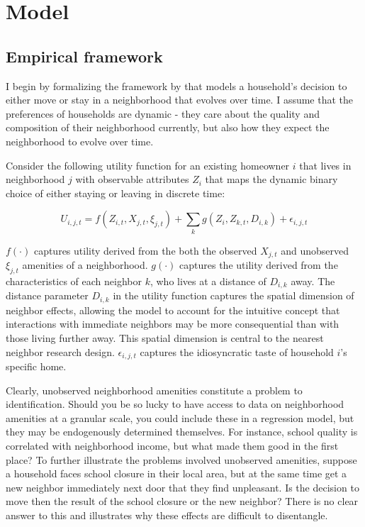 \documentclass[../main.tex]{subfiles}
\begin{document}
\section{Model}
\label{sec:model}

\subsection{Empirical framework}
I begin by formalizing the framework by \textcite{Bayer_2022_nearest_neighbor} that models a household's decision to either move or stay in a neighborhood that evolves over time. I assume that the preferences of households are dynamic - they care about the quality and composition of their neighborhood currently, but also how they expect the neighborhood to evolve over time. 


Consider the following utility function for an existing homeowner $i$ that lives in neighborhood $j$ with observable attributes $Z_i$ that maps the dynamic binary choice of either staying or leaving in discrete time:

\begin{equation}
    U_{i, j, t} = f(Z_{i,t}, X_{j, t}, \xi_{j,t }) + \sum_k g(Z_i, Z_{k, t}, D_{i, k}) + \epsilon_{i, j, t}
    \label{eq:utility_household_moving}
\end{equation}



$f(\cdot)$ captures utility derived from the both the observed $X_{j,t}$ and unobserved $\xi_{j,t}$ amenities of a neighborhood. $g(\cdot)$ captures the utility derived from the characteristics of each neighbor $k$, who lives at a distance of $D_{i, k}$ away. The distance parameter $D_{i,k}$ in the utility function captures the spatial dimension of neighbor effects, allowing the model to account for the intuitive concept that interactions with immediate neighbors may be more consequential than with those living further away. This spatial dimension is central to the nearest neighbor research design. $\epsilon_{i, j, t}$ captures the idiosyncratic taste of household $i$'s specific home. 

Clearly, unobserved neighborhood amenities constitute a problem to identification. Should you be so lucky to have access to data on neighborhood amenities at a granular scale, you could include these in a regression model, but they may be endogenously determined themselves. For instance, school quality is correlated with neighborhood income, but what made them good in the first place? To further illustrate the problems involved unobserved amenities, suppose a household faces school closure in their local area, but at the same time get a new neighbor immediately next door that they find unpleasant. Is the decision to move then the result of the school closure or the new neighbor? There is no clear answer to this and illustrates why these effects are difficult to disentangle.
\end{document}
